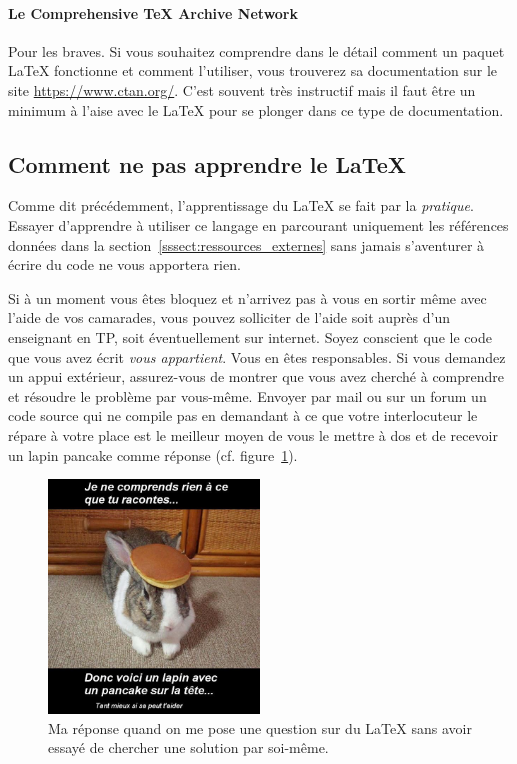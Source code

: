            \paragraph{Le Comprehensive \TeX{} Archive Network}
                Pour les braves.
                Si vous souhaitez comprendre dans le détail comment un paquet \LaTeX{} fonctionne et comment l'utiliser, vous trouverez sa documentation sur le site \url{https://www.ctan.org/}.
                C'est souvent très instructif mais il faut être un minimum à l'aise avec le \LaTeX{} pour se plonger dans ce type de documentation.




    \subsection{Comment ne pas apprendre le \LaTeX}
        Comme dit précédemment, l'apprentissage du \LaTeX{} se fait par la \emph{pratique}.
        Essayer d'apprendre à utiliser ce langage en parcourant uniquement les références données dans la section~\ref{sssect:ressources_externes} sans jamais s'aventurer à écrire du code ne vous apportera rien.
        
        Si à un moment vous êtes bloquez et n'arrivez pas à vous en sortir même avec l'aide de vos camarades, vous pouvez solliciter de l'aide soit auprès d'un enseignant en TP, soit éventuellement sur internet.
        Soyez conscient que le code que vous avez écrit \emph{vous appartient}.
        Vous en êtes responsables.
        Si vous demandez un appui extérieur, assurez-vous de montrer que vous avez cherché à comprendre et résoudre le problème par vous-même.
        Envoyer par mail ou sur un forum un code source qui ne compile pas en demandant à ce que votre interlocuteur le répare à votre place est le meilleur moyen de vous le mettre à dos et de recevoir un lapin pancake comme réponse (cf. figure~\ref{lapin}).
        
        
        \begin{figure}[!ht]
            \centering %
                \includegraphics[width=0.5\textwidth]{images/pancake-bunny.jpg} %
            \caption{Ma réponse quand on me pose une question sur du \LaTeX{} sans avoir essayé de chercher une solution par soi-même.} %
            \label{lapin} %
        \end{figure}
